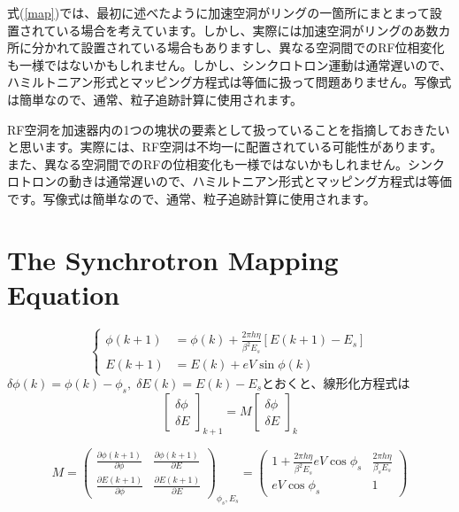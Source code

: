 \documentclass[10pt,a4paper]{jlreq}
\begin{document}
式(\ref{map})では、最初に述べたように加速空洞がリングの一箇所にまとまって設置されている場合を考えています。しかし、実際には加速空洞がリングのあ数カ所に分かれて設置されている場合もありますし、異なる空洞間でのRF位相変化も一様ではないかもしれません。しかし、シンクロトロン運動は通常遅いので、ハミルトニアン形式とマッピング方程式は等価に扱って問題ありません。写像式は簡単なので、通常、粒子追跡計算に使用されます。

RF空洞を加速器内の1つの塊状の要素として扱っていることを指摘しておきたいと思います。実際には、RF空洞は不均一に配置されている可能性があります。また、異なる空洞間でのRFの位相変化も一様ではないかもしれません。シンクロトロンの動きは通常遅いので、ハミルトニアン形式とマッピング方程式は等価です。写像式は簡単なので、通常、粒子追跡計算に使用されます。

\section{The Synchrotron Mapping Equation}

\begin{equation}
  \left\{
    \begin{aligned}
      \phi(k+1) &= \phi(k) + \frac{2\pi h \eta }{\beta^2 E_s}[E(k+1)-E_s] \\
      E(k+1) &= E(k)+ e V \sin\phi(k)
    \end{aligned}
  \right.
\end{equation}
%
$\delta \phi(k) = \phi(k) -\phi_s, \; \delta E(k) = E(k)-E_s$とおくと、線形化方程式は
%
\begin{equation}
  \begin{bmatrix}
    \delta\phi\\
    \delta E
  \end{bmatrix}
  _{k+1} = M
  \begin{bmatrix}
    \delta\phi\\
    \delta E
  \end{bmatrix}
  _k
\end{equation}

\begin{equation}
  M =
  \begin{pmatrix}
    \frac{\partial\phi(k+1)}{\partial\phi} & \frac{\partial\phi(k+1)}{\partial E} \\
    \frac{\partial E(k+1)}{\partial\phi} & \frac{\partial E(k+1)}{\partial E}
  \end{pmatrix}
  _{\phi_s, E_s} =
  \begin{pmatrix}
    1+\frac{2\pi h \eta}{\beta^2 E_s} e V \cos\phi_s & \frac{2\pi h\eta}{\beta_s E_s} \\
    e V \cos\phi_s & 1
  \end{pmatrix}
\end{equation}
\end{document}
